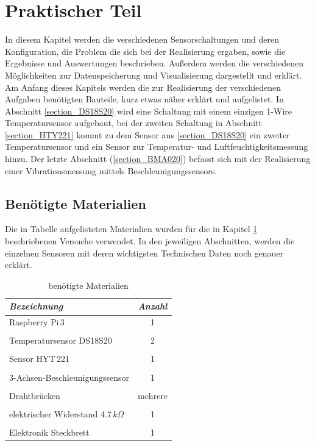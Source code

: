\chapter{Praktischer Teil}
\label{chapter_Praktischer_Teil}
In diesem Kapitel werden die verschiedenen Sensorschaltungen und deren Konfiguration, die Problem
die sich bei der Realisierung ergaben, sowie die Ergebnisse und Auswertungen beschrieben. Außerdem werden die verschiedenen Möglichkeiten zur Datenspeicherung und Visualisierung dargestellt und erklärt. Am Anfang dieses Kapitels werden die zur Realisierung der verschiedenen Aufgaben benötigten Bauteile, kurz etwas näher erklärt und aufgelistet. In Abschnitt \ref{section_DS18S20} wird eine Schaltung mit einem einzigen 1-Wire Temperatursensor aufgebaut, bei der zweiten Schaltung in Abschnitt \ref{section_HTY221} kommt zu dem Sensor aus \ref{section_DS18S20} ein zweiter Temperatursensor und ein Sensor zur Temperatur- und Luftfeuchtigkeitsmessung hinzu. Der letzte Abschnitt (\ref{section_BMA020}) befasst sich mit der Realisierung einer Vibrationsmessung mittels Beschleunigungssensors.

\section{Benötigte Materialien}
\label{section_Benötigte_Materialien}
Die in Tabelle aufgelisteten Materialien wurden für die in Kapitel \ref{chapter_Praktischer_Teil} beschriebenen Versuche verwendet. In den jeweiligen Abschnitten, werden die  einzelnen Sensoren mit deren wichtigsten Technischen Daten noch genauer erklärt. 

\begin{table}[H]
\centering
\begin{tabular}{
lc
}
\toprule
\multicolumn{1}{p{6cm}}{\textit{Bezeichnung}} & \multicolumn{1}{p{3.5cm}}{\centering\textit{Anzahl} } \\\midrule
Raspberry Pi\,3& 1 \\
&\\
Temperatursensor DS18S20 & 2 \\
&\\
Sensor HYT\,221 & 1\\
&\\
3-Achsen-Beschleunigungssensor & 1\\
&\\
Drahtbrücken & mehrere\\
&\\
elektrischer Widerstand 4.7\,$k\Omega$ & 1\\
&\\
Elektronik Steckbrett & 1\\
\bottomrule
\end{tabular}
\caption{benötigte Materialien}
\label{Tabelle_benötigte_Materialien}
\end{table}

